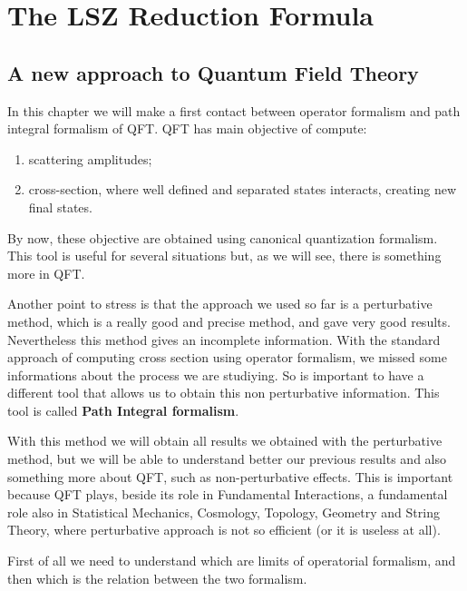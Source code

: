 \documentclass[../main/main.tex]{subfiles}
\begin{document}
\chapter{The LSZ Reduction Formula}


\section{A new approach to Quantum Field Theory}
In this chapter we will make a first contact between operator formalism  and path integral formalism of QFT. 
QFT has main objective of compute:
\begin{enumerate}
\item scattering amplitudes;
\item cross-section, where well defined and separated states interacts, creating new final states.
\end{enumerate}
By now, these objective are obtained using canonical quantization formalism. This tool is useful for several situations but, as we will see, there is something more in QFT.

Another point to stress is that the approach we used so far is a perturbative method, which is a really good and precise method, and gave very good results. Nevertheless this method gives an incomplete information. With the standard approach of computing cross section using operator formalism, we missed some informations about the process we are studiying. So is important to have a different tool that allows us to obtain this non perturbative information. This tool is called \textbf{Path Integral formalism}.

With this method we will obtain all results we obtained with the perturbative method, but we will be able to understand better our previous results and also something more about QFT, such as non-perturbative effects. This is important because QFT plays, beside its role in Fundamental Interactions, a fundamental role also in Statistical Mechanics, Cosmology, Topology, Geometry and String Theory, where perturbative approach is not so efficient (or it is useless at all).

First of all we need to understand which are limits of operatorial formalism, and then which is the relation between the two formalism.
\end{document}
